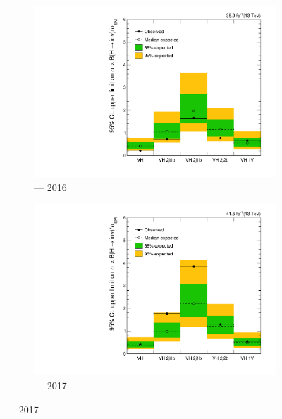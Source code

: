 \begin{figure}[htbp]
    \centering
    \begin{subfigure}[b]{0.49\textwidth}
        \includegraphics[width=\textwidth]{chapters/higgstoinv/figures/limits/VH/limit_2016_VH.pdf}
        \caption{\VH --- 2016}
        \label{fig:htoinv_limit_VH_2016}
    \end{subfigure}
    \hfill
    \begin{subfigure}[b]{0.49\textwidth}
        \includegraphics[width=\textwidth]{chapters/higgstoinv/figures/limits/VH/limit_2017_VH.pdf}
        \caption{\VH --- 2017}
    \end{subfigure}


\end{figure}
